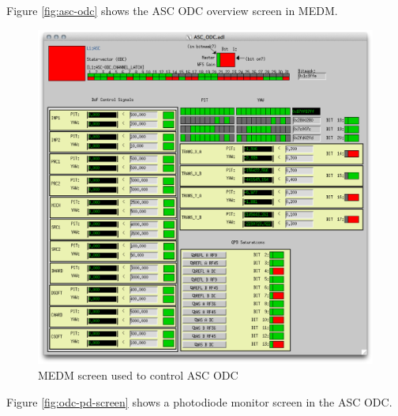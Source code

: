 Figure \ref{fig:asc-odc} shows the ASC ODC overview screen in MEDM.

\begin{figure}[ht!]
\includegraphics[width=\textwidth]{figures/ODC/ASC_screen}
\caption[ASC ODC Overview Screen]{MEDM screen used to control ASC ODC}
\end{figure}\label{fig:asc-odc}

Figure \ref{fig:odc-pd-screen} shows a photodiode monitor screen in the ASC ODC. 

